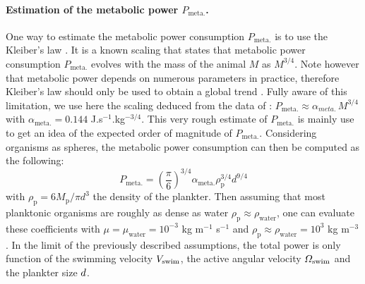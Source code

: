 \paragraph{Estimation of the metabolic power $P_{\mathrm{meta.}}$.}

One way to estimate the metabolic power consumption $P_{\mathrm{meta.}}$ is to use the Kleiber's law \citep{kleiber1961fire}.
It is a known scaling that states that metabolic power consumption $P_{\mathrm{meta.}}$ evolves with the mass of the animal $M$ as $M^{3/4}$.
Note however that metabolic power depends on numerous parameters in practice, therefore Kleiber's law should only be used to obtain a global trend \citep{glazier2005beyond}.
Fully aware of this limitation, we use here the scaling deduced from the data of \citet{gillooly2001effects}: $P_{\mathrm{meta.}} \approx \alpha_{meta.} \, M^{3/4}$ with $\alpha_{\mathrm{meta.}} = 0.144$ J.s$^{-1}$.kg$^{-3/4}$.
This very rough estimate of $P_{\mathrm{meta.}}$ is mainly use to get an idea of the expected order of magnitude of $P_{\mathrm{meta.}}$.
Considering organisms as spheres, the metabolic power consumption can then be computed as the following:
\begin{equation}\label{eq:kleiber}
	P_{\mathrm{meta.}} = \left( \frac{\pi}{6} \right)^{3/4} \alpha_{\mathrm{meta.}} \rho_{\mathrm{p}}^{3/4} d^{9/4}
\end{equation}
with $\rho_{\mathrm{p}} = 6 M_{\mathrm{p}} / \pi d^3$ the density of the plankter.
Then assuming that most planktonic organisms are roughly as dense as water $\rho_{\mathrm{p}} \approx \rho_{\mathrm{water}}$, one can evaluate these coefficients with $\mu = \mu_{\mathrm{water}} = 10^{-3}$ kg m$^{-1}$ s$^{-1}$ and $\rho_{\mathrm{p}} \approx \rho_{\mathrm{water}} = 10^{3}$ kg m$^{-3}$.
In the limit of the previously described assumptions, the total power is only function of the swimming velocity $V_{\mathrm{swim}}$, the active angular velocity $\varOmega_{\mathrm{swim}}$ and the plankter size $d$.

